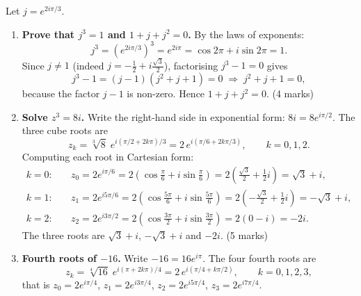 \documentclass[11pt]{article}
\begin{document}
\begin{corrige}
Let $j = e^{2i\pi/3}$.
\begin{enumerate}
\item \textbf{Prove that $j^3 = 1$ and $1 + j + j^2 = 0$.} By the laws of exponents:
\[
j^3 = \left(e^{2i\pi/3}\right)^3 = e^{2i\pi} = \cos 2\pi + i\sin 2\pi = 1.
\]
Since $j \neq 1$ (indeed $j = -\frac{1}{2} + i\frac{\sqrt{3}}{2}$), factorising $j^3 - 1 = 0$ gives
\[
j^3 - 1 = (j - 1)(j^2 + j + 1) = 0 \;\Rightarrow\; j^2 + j + 1 = 0,
\]
because the factor $j - 1$ is non-zero. Hence $1 + j + j^2 = 0$. \hfill (4 marks)
\item \textbf{Solve $z^3 = 8i$.} Write the right-hand side in exponential form: $8i = 8e^{i\pi/2}$. The three cube roots are
\[
z_k = \sqrt[3]{8}\; e^{i(\pi/2 + 2k\pi)/3} = 2\, e^{i(\pi/6 + 2k\pi/3)}, \qquad k = 0, 1, 2.
\]
Computing each root in Cartesian form:
\begin{align*}
k=0:&\quad z_0 = 2e^{i\pi/6} = 2\left(\cos\frac{\pi}{6} + i\sin\frac{\pi}{6}\right) = 2\left(\frac{\sqrt{3}}{2} + \frac{1}{2}i\right) = \sqrt{3} + i,\\
k=1:&\quad z_1 = 2e^{i5\pi/6} = 2\left(\cos\frac{5\pi}{6} + i\sin\frac{5\pi}{6}\right) = 2\left(-\frac{\sqrt{3}}{2} + \frac{1}{2}i\right) = -\sqrt{3} + i,\\
k=2:&\quad z_2 = 2e^{i3\pi/2} = 2\left(\cos\frac{3\pi}{2} + i\sin\frac{3\pi}{2}\right) = 2(0 - i) = -2i.
\end{align*}
The three roots are $\sqrt{3}+i$, $-\sqrt{3}+i$ and $-2i$. \hfill (5 marks)
\item \textbf{Fourth roots of $-16$.} Write $-16 = 16e^{i\pi}$. The four fourth roots are
\[
z_k = \sqrt[4]{16}\; e^{i(\pi + 2k\pi)/4} = 2\, e^{i(\pi/4 + k\pi/2)}, \qquad k = 0, 1, 2, 3,
\]
that is $z_0 = 2e^{i\pi/4}$, $z_1 = 2e^{i3\pi/4}$, $z_2 = 2e^{i5\pi/4}$, $z_3 = 2e^{i7\pi/4}$.
\begin{popfigure}
\begin{center}
\end{center}
\end{popfigure}
\end{enumerate}
\end{corrige}
\end{document}
